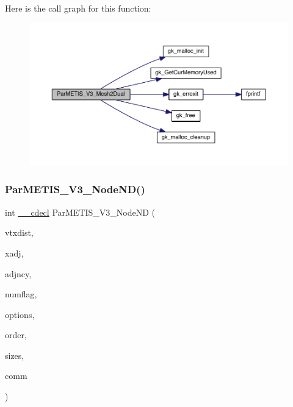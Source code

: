 Here is the call graph for this function\+:\nopagebreak
\begin{figure}[H]
\begin{center}
\leavevmode
\includegraphics[width=350pt]{a00843_a2f9e316d7e0c46037cf231cd82cf9d97_cgraph}
\end{center}
\end{figure}
\mbox{\label{a00843_add23df29b4f232ac4c2cca94cc083a32}} 
\subsubsection{\texorpdfstring{Par\+M\+E\+T\+I\+S\+\_\+\+V3\+\_\+\+Node\+N\+D()}{ParMETIS\_V3\_NodeND()}}
{\footnotesize\ttfamily int \hyperlink{a00843_a238347d7669f8f1e9c83bfe63a2730c4}{\+\_\+\+\_\+cdecl} Par\+M\+E\+T\+I\+S\+\_\+\+V3\+\_\+\+Node\+ND (\begin{DoxyParamCaption}\item[{\hyperlink{a00876_aaa5262be3e700770163401acb0150f52}{idx\+\_\+t} $\ast$}]{vtxdist,  }\item[{\hyperlink{a00876_aaa5262be3e700770163401acb0150f52}{idx\+\_\+t} $\ast$}]{xadj,  }\item[{\hyperlink{a00876_aaa5262be3e700770163401acb0150f52}{idx\+\_\+t} $\ast$}]{adjncy,  }\item[{\hyperlink{a00876_aaa5262be3e700770163401acb0150f52}{idx\+\_\+t} $\ast$}]{numflag,  }\item[{\hyperlink{a00876_aaa5262be3e700770163401acb0150f52}{idx\+\_\+t} $\ast$}]{options,  }\item[{\hyperlink{a00876_aaa5262be3e700770163401acb0150f52}{idx\+\_\+t} $\ast$}]{order,  }\item[{\hyperlink{a00876_aaa5262be3e700770163401acb0150f52}{idx\+\_\+t} $\ast$}]{sizes,  }\item[{M\+P\+I\+\_\+\+Comm $\ast$}]{comm }\end{DoxyParamCaption})}

